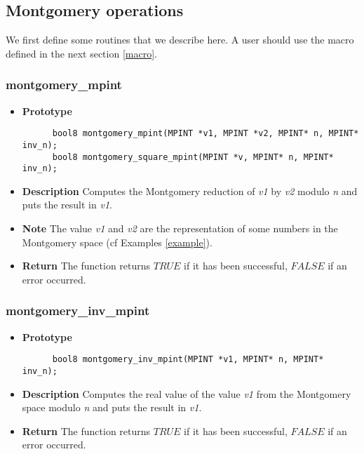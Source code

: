 \documentclass[10pt,a4paper]{article}
\begin{document}
  \subsection{Montgomery operations}
  
  We first define some routines that we describe here. A user should use the macro defined in the next section \ref{macro}.
  
  \subsubsection{montgomery\_mpint}
  
  \begin{itemize}
    \item [] \textbf{Prototype}
    \begin{lstlisting}
      bool8 montgomery_mpint(MPINT *v1, MPINT *v2, MPINT* n, MPINT* inv_n);
      bool8 montgomery_square_mpint(MPINT *v, MPINT* n, MPINT* inv_n);
    \end{lstlisting}
    \item [] \textbf{Description} Computes the Montgomery reduction of \textit{v1} by \textit{v2} modulo \textit{n} and puts the result in \textit{v1}.
    \item [] \textbf{Note} The value \textit{v1} and \textit{v2} are the representation of some numbers in the Montgomery space (cf Examples \ref{example}).
    \item [] \textbf{Return} The function returns $TRUE$ if it has been successful, $FALSE$ if an error occurred.
  \end{itemize}
  
  \subsubsection{montgomery\_inv\_mpint}
  
  \begin{itemize}
    \item [] \textbf{Prototype}
    \begin{lstlisting}
      bool8 montgomery_inv_mpint(MPINT *v1, MPINT* n, MPINT* inv_n);
    \end{lstlisting}
    \item [] \textbf{Description} Computes the real value of the value \textit{v1} from the Montgomery space modulo \textit{n} and puts the result in \textit{v1}.
    \item [] \textbf{Return} The function returns $TRUE$ if it has been successful, $FALSE$ if an error occurred.
  \end{itemize}
  
\end{document}

